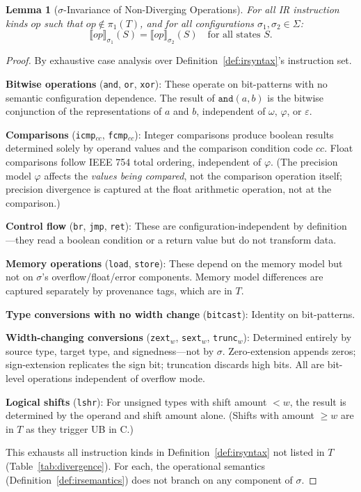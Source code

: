 \documentclass[11pt]{article}
\newtheorem{lemma}[theorem]{Lemma}
\newcommand{\SemConfig}{\sigma}
\begin{document}
\begin{lemma}[$\SemConfig$-Invariance of Non-Diverging Operations]
\label{lem:invariance}
For all IR instruction kinds $\mathit{op}$ such that $\mathit{op} \notin \pi_1(T)$, and for all configurations $\SemConfig_1, \SemConfig_2 \in \Sigma$:
\[
\llbracket \mathit{op} \rrbracket_{\SemConfig_1}(S) = \llbracket \mathit{op} \rrbracket_{\SemConfig_2}(S) \quad \text{for all states } S.
\]
\end{lemma}

\begin{proof}
By exhaustive case analysis over Definition~\ref{def:irsyntax}'s instruction set.

\textbf{Bitwise operations} (\texttt{and}, \texttt{or}, \texttt{xor}): These operate on bit-patterns with no semantic configuration dependence. The result of $\texttt{and}(a, b)$ is the bitwise conjunction of the representations of $a$ and $b$, independent of $\omega$, $\varphi$, or $\varepsilon$.

\textbf{Comparisons} (\texttt{icmp}$_{cc}$, \texttt{fcmp}$_{cc}$): Integer comparisons produce boolean results determined solely by operand values and the comparison condition code $cc$. Float comparisons follow IEEE 754 total ordering, independent of $\varphi$. (The precision model $\varphi$ affects the \emph{values being compared}, not the comparison operation itself; precision divergence is captured at the float arithmetic operation, not at the comparison.)

\textbf{Control flow} (\texttt{br}, \texttt{jmp}, \texttt{ret}): These are configuration-independent by definition---they read a boolean condition or a return value but do not transform data.

\textbf{Memory operations} (\texttt{load}, \texttt{store}): These depend on the memory model but not on $\SemConfig$'s overflow/float/error components. Memory model differences are captured separately by provenance tags, which are in $T$.

\textbf{Type conversions with no width change} (\texttt{bitcast}): Identity on bit-patterns.

\textbf{Width-changing conversions} (\texttt{zext}$_w$, \texttt{sext}$_w$, \texttt{trunc}$_w$): Determined entirely by source type, target type, and signedness---not by $\SemConfig$. Zero-extension appends zeros; sign-extension replicates the sign bit; truncation discards high bits. All are bit-level operations independent of overflow mode.

\textbf{Logical shifts} (\texttt{lshr}): For unsigned types with shift amount $< w$, the result is determined by the operand and shift amount alone. (Shifts with amount $\geq w$ are in $T$ as they trigger UB in C.)

This exhausts all instruction kinds in Definition~\ref{def:irsyntax} not listed in $T$ (Table~\ref{tab:divergence}). For each, the operational semantics (Definition~\ref{def:irsemantics}) does not branch on any component of $\SemConfig$.
\end{proof}
\end{document}
